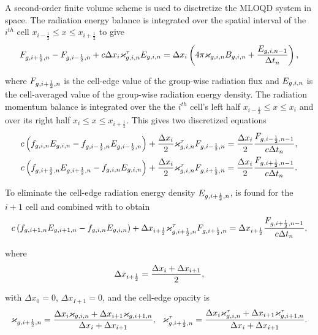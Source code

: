 	
	A second-order finite volume scheme is used to disctretize the MLOQD system in space. The radiation energy balance  is integrated over the spatial interval of the $i^{th}$ cell $x_{i-\frac{1}{2}}\leq x\leq x_{i+\frac{1}{2}}$ to give
	\begin{equation}
		F_{g,i+\frac{1}{2},n} - F_{g,i-\frac{1}{2},n} + c\Delta x_{i}\varkappa_{g,i,n}^\tau E_{g,i,n} = \Delta x_{i}\left(4\pi\varkappa_{g,i,n}B_{g,i,n} + \frac{E_{g,i,n-1}}{\Delta t_n}\right), \label{mqd_1_disc}
	\end{equation}
	
	where $F_{g,i+\frac{1}{2},n}$ is the cell-edge value of the group-wise radiation flux and $E_{g,i,n}$ is the cell-averaged value of the group-wise radiation energy density. The radiation momentum balance  is integrated over the the $i^{th}$ cell's left half $x_{i-\frac{1}{2}}\leq x\leq x_{i}$ and over its right half $x_{i}\leq x\leq x_{i+\frac{1}{2}}$. This gives two discretized equations
	\begin{gather}
		c\left(f_{g,i,n}E_{g,i,n} - f_{g,i-\frac{1}{2},n}E_{g,i-\frac{1}{2},n}\right) + \frac{\Delta x_{i}}{2}\varkappa_{g,i,n}^\tau F_{g,i-\frac{1}{2},n} = \frac{\Delta x_{i}}{2}\frac{F_{g,i-\frac{1}{2},n-1}}{c\Delta t_n}, \label{mloqd_disc_left}\\
		c\left(f_{g,i+\frac{1}{2},n}E_{g,i+\frac{1}{2},n} - f_{g,i,n}E_{g,i,n}\right) + \frac{\Delta x_{i}}{2}\varkappa_{g,i,n}^\tau F_{g,i+\frac{1}{2},n} = \frac{\Delta x_{i}}{2}\frac{F_{g,i+\frac{1}{2},n-1}}{c\Delta t_n} \label{mloqd_disc_right}.
	\end{gather}
	
	To eliminate the cell-edge radiation energy density $E_{g,i+\frac{1}{2},n}$,  is found for the $i+1$ cell and combined with  to obtain
	\begin{equation}
		c\left(f_{g,i+1,n}E_{g,i+1,n} - f_{g,i,n}E_{g,i,n}\right) + \Delta x_{i+\frac{1}{2}}\varkappa_{g,i+\frac{1}{2},n}^\tau F_{g,i+\frac{1}{2},n} = \Delta x_{i+\frac{1}{2}}\frac{F_{g,i+\frac{1}{2},n-1}}{c\Delta t_n}, \label{mqd_2_disc}
	\end{equation}
	
	where
	\begin{equation}
		\Delta x_{i+\frac{1}{2}} = \frac{\Delta x_{i} + \Delta x_{i+1}}{2},
	\end{equation}
	
	with $\Delta x_0=0$, $\Delta x_{I+1}=0$, and the cell-edge opacity is
	\begin{equation}
		\varkappa_{g,i+\frac{1}{2},n} = \frac{\Delta x_{i}\varkappa_{g,i,n}+\Delta x_{i+1}\varkappa_{g,i+1,n}}{\Delta x_{i}+\Delta x_{i+1}}, \ \ \varkappa_{g,i+\frac{1}{2},n}^\tau = \frac{\Delta x_{i}\varkappa_{g,i,n}^\tau+\Delta x_{i+1}\varkappa_{g,i+1,n}^\tau}{\Delta x_{i}+\Delta x_{i+1}}.
	\end{equation}
	
